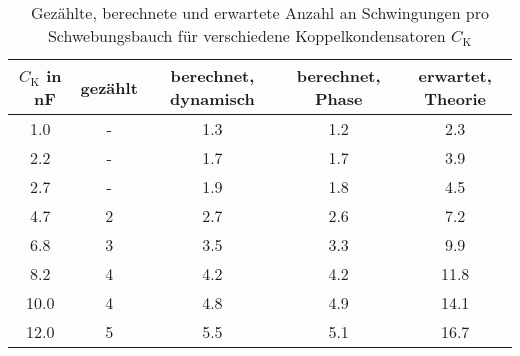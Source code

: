 \begin{table}[h!]
\begin{center}
\begin{tabular}{c | c | c | c | c}
	$C_\text{K}$ in \SI{}{\nano\farad} & gezählt & berechnet, dynamisch & berechnet, Phase & erwartet, Theorie \\
\hline
	1.0 & - & 1.3 & 1.2 & 2.3 \\
	2.2 & - & 1.7 & 1.7 & 3.9 \\
	2.7 & - & 1.9 & 1.8 & 4.5 \\
	4.7 & 2 & 2.7 & 2.6 & 7.2 \\
	6.8 & 3 & 3.5 & 3.3 & 9.9 \\
	8.2 & 4 & 4.2 & 4.2 & 11.8 \\
	10.0 & 4 & 4.8 & 4.9 & 14.1 \\
	12.0 & 5 & 5.5 & 5.1 & 16.7 \\
\end{tabular}
\end{center}
\caption{Gezählte, berechnete und erwartete Anzahl an Schwingungen pro Schwebungsbauch für verschiedene Koppelkondensatoren $C_\text{K}$}
\label{fig:Bauch}
\end{table}
